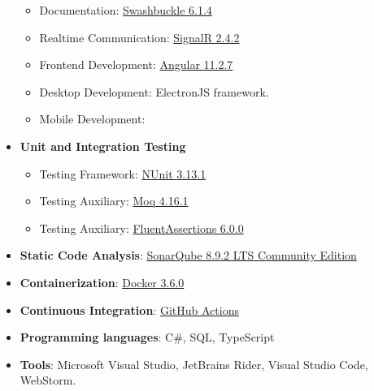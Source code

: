\begin{itemize}
    \begin{itemize}
        \item Documentation: \href{https://www.nuget.org/packages/Swashbuckle.AspNetCore/5.6.3?_src=template}{Swashbuckle 6.1.4}
        \item Realtime Communication: \href{https://www.nuget.org/packages/Microsoft.AspNet.SignalR/}{SignalR 2.4.2}
        \item Frontend Development: \href{https://angular.io/guide/setup-local}{Angular 11.2.7}
        \item Desktop Development: ElectronJS framework.
        \item Mobile Development:
    \end{itemize}
    \item \textbf{Unit and Integration Testing}
    \begin{itemize}
        \item Testing Framework: \href{https://www.nuget.org/packages/NUnit/}{NUnit 3.13.1}
        \item Testing Auxiliary: \href{https://www.nuget.org/packages/Moq/}{Moq 4.16.1}
        \item Testing Auxiliary: \href{https://www.nuget.org/packages/FluentAssertions}{FluentAssertions 6.0.0}
    \end{itemize}
    \item \textbf{Static Code Analysis}: \href{https://www.sonarqube.org/downloads/}{SonarQube 8.9.2 LTS Community Edition}
    \item \textbf{Containerization}: \href{https://docs.docker.com/desktop/windows/install/}{Docker 3.6.0}
    \item \textbf{Continuous Integration}: \href{https://docs.github.com/en/actions}{GitHub Actions}
    \item \textbf{Programming languages}: C\#, SQL, TypeScript
    \item \textbf{Tools}: Microsoft Visual Studio, JetBrains Rider, Visual Studio Code, WebStorm.
\end{itemize}